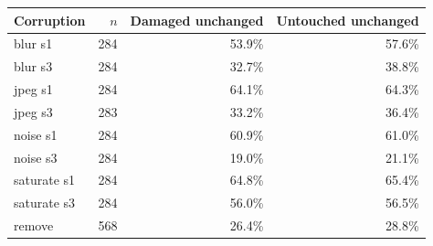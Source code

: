 \begin{tabular}{lrrr}
\toprule
Corruption & $n$ & Damaged unchanged & Untouched unchanged \\
\midrule
blur s1 & 284 & 53.9\% & 57.6\% \\
blur s3 & 284 & 32.7\% & 38.8\% \\
jpeg s1 & 284 & 64.1\% & 64.3\% \\
jpeg s3 & 283 & 33.2\% & 36.4\% \\
noise s1 & 284 & 60.9\% & 61.0\% \\
noise s3 & 284 & 19.0\% & 21.1\% \\
saturate s1 & 284 & 64.8\% & 65.4\% \\
saturate s3 & 284 & 56.0\% & 56.5\% \\
remove & 568 & 26.4\% & 28.8\% \\
\bottomrule
\end{tabular}
